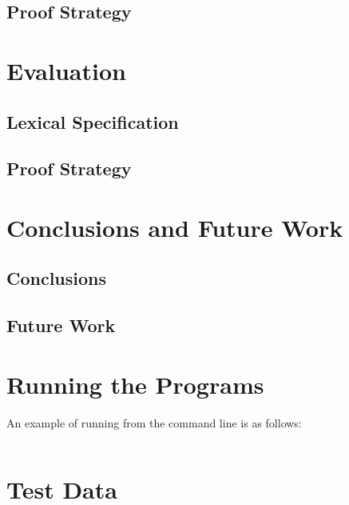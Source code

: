 \documentclass{l4proj}
\begin{document}
\section{Proof Strategy}


\chapter{Evaluation}

\section{Lexical Specification}

\section{Proof Strategy}

\chapter{Conclusions and Future Work}

\section{Conclusions}

\section{Future Work}

\begin{appendices}

\chapter{Running the Programs}
An example of running from the command line is as follows:
\begin{verbatim}
\end{verbatim}

\chapter{Test Data}

\end{appendices}




\end{document}
